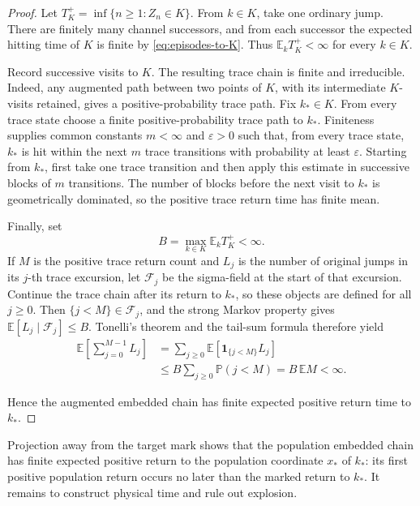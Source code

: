 \begin{proof}
Let \(T_K^+=\inf\{n\ge1:Z_n\in K\}\).  From \(k\in K\), take one ordinary
jump.  There are finitely many channel successors, and from each successor
the expected hitting time of \(K\) is finite by \eqref{eq:episodes-to-K}.
Thus \(\mathbb E_kT_K^+<\infty\) for every \(k\in K\).

Record successive visits to \(K\).  The resulting trace chain is finite and
irreducible.  Indeed, any augmented path between two points of \(K\), with
its intermediate \(K\)-visits retained, gives a positive-probability trace
path.  Fix \(k_*\in K\).  From every trace state choose a finite
positive-probability trace path to \(k_*\).  Finiteness supplies common
constants \(m<\infty\) and \(\varepsilon>0\) such that, from every trace
state, \(k_*\) is hit within the next \(m\) trace transitions with probability
at least \(\varepsilon\).  Starting from \(k_*\), first take one trace
transition and then apply this estimate in successive blocks of \(m\)
transitions.  The number of blocks before the next visit to \(k_*\) is
geometrically dominated, so the positive trace return time has finite mean.

Finally, set
\[
  B=\max_{k\in K}\mathbb E_kT_K^+<\infty.
\]
If \(M\) is the positive trace return count and \(L_j\) is the number of
original jumps in its \(j\)-th trace excursion, let \(\mathcal F_j\) be the
sigma-field at the start of that excursion.  Continue the trace chain after
its return to \(k_*\), so these objects are defined for all \(j\ge0\).  Then
\(\{j<M\}\in\mathcal F_j\), and the strong Markov property gives
\(\mathbb E[L_j\mid\mathcal F_j]\le B\).  Tonelli's theorem and the tail-sum
formula therefore yield
\[
\begin{aligned}
  \mathbb E\!\left[\sum_{j=0}^{M-1}L_j\right]
  &=\sum_{j\ge0}\mathbb E\!\left[
      \mathbf1_{\{j<M\}}L_j\right]\\
  &\le B\sum_{j\ge0}\mathbb P(j<M)
   =B\,\mathbb E M<\infty.
\end{aligned}
\]

\noindent
Hence the augmented embedded chain has finite expected positive return time
to \(k_*\).
\end{proof}

Projection away from the target mark shows that the population embedded chain
has finite expected positive return to the population coordinate \(x_*\) of
\(k_*\): its first positive population return occurs no later than the marked
return to \(k_*\).
It remains to construct physical time and rule out explosion.

